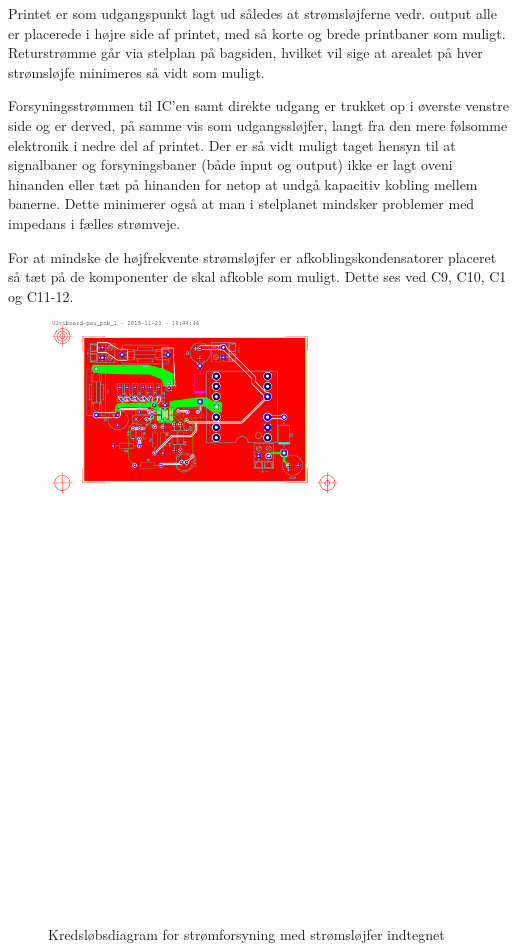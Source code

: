 Printet er som udgangspunkt lagt ud således at strømsløjferne vedr. output alle er placerede i højre side af printet, med så korte og brede printbaner som muligt. 
Returstrømme går via stelplan på bagsiden, hvilket vil sige at arealet på hver strømsløjfe minimeres så vidt som muligt.

Forsyningsstrømmen til IC'en samt direkte udgang er trukket op i øverste venstre side og er derved, på samme vis som udgangssløjfer, langt fra den mere følsomme elektronik i nedre del af printet. 
Der er så vidt muligt taget hensyn til at signalbaner og forsyningsbaner (både input og output) ikke er lagt oveni hinanden eller tæt på hinanden for netop at undgå kapacitiv kobling mellem banerne.
Dette minimerer også at man i stelplanet mindsker problemer med impedans i fælles strømveje. 

For at mindske de højfrekvente strømsløjfer er afkoblingskondensatorer placeret så tæt på de komponenter de skal afkoble som muligt. Dette ses ved C9, C10, C1 og C11-12.

\clearpage

\begin{landscape}
\begin{figure}
\centering
\includegraphics[height=\textwidth-2.5cm, clip=true, trim=50 615 234 25]{../fig/diagrammer/bil/psu_pcb_twoside}
\caption{Kredsløbsdiagram for strømforsyning med strømsløjfer indtegnet}
\label{fig:psu_pcb}
\end{figure}
\end{landscape}


